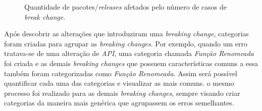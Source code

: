 \begin {figure} [h!]
{        
    }
    \caption{Quantidade de pacotes/\textit{releases} afetados pelo número de casos de \textit{break change}.}
    \label{fig:result_rq1_once_twice_three}
\end{figure}

Após descobrir as alterações que introduziram uma \textit{breaking change}, categorias foram criadas para agrupar as \textit{breaking changes}. Por exemplo, quando um erro tratava-se de uma alteração de \textit{API}, uma categoria chamada \textit{Função Renomeada} foi criada e as demais \textit{breaking changes} que possuem características comuns a essa também foram categorizadas como \textit{Função Renomeada}. Assim será possível quantificar cada uma das categorias e visualizar as mais comuns. o mesmo processo foi realizado para as demais \textit{breaking changes}, sempre visando criar categorias da maneira mais genérica que agrupassem os erros semelhantes.

